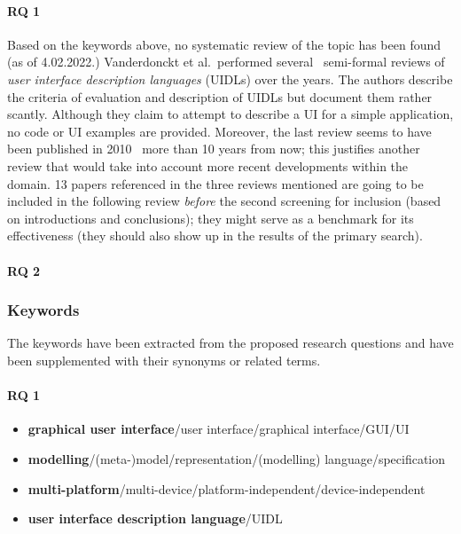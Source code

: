 \paragraph{RQ 1}
Based on the keywords above, no systematic review of the topic has been found (as of 4.02.2022.)
Vanderdonckt et al.\ performed several~\cite{souchon_review_2003,guerrero_garcia_theoretical_2009,guerrero_garcia_theoretical_2011}
semi-formal reviews of \emph{user interface description languages} (UIDLs) over the years.
The authors describe the criteria of evaluation and description of UIDLs but document them rather scantly.
Although they claim to attempt to describe a UI for a simple application, no code or UI examples are provided.
Moreover, the last review seems to have been published in 2010 \textendash\ more than 10 years from now;
this justifies another review that would take into account more recent developments within the domain.
13 papers referenced in the three reviews mentioned are going to be included in the following review
\emph{before} the second screening for inclusion (based on introductions and conclusions);
they might serve as a benchmark for its effectiveness (they should also show up in the results of the primary search).

\paragraph{RQ 2}

\subsubsection{Keywords}
The keywords have been extracted from the proposed research questions
and have been supplemented with their synonyms or related terms.

\paragraph{RQ 1}

\begin{itemize}
    \item \textbf{graphical user interface}/user interface/graphical interface/GUI/UI
    \item \textbf{modelling}/(meta-)model/representation/(modelling) language/specification
    \item \textbf{multi-platform}/multi-device/platform-independent/device-independent
    \item \textbf{user interface description language}/UIDL
\end{itemize}

